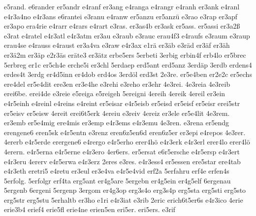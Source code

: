 {    e5rand.
    e6rander
    er5andr
    e4ranf
    er3ang
    e4ranga
    e4rangr
    e4ranh
    er3ank
    e4ranl
    e4r3a4no
    e4r3ans
    e6rantei
    e3ranu
    e4ranw
    er5anzu
    er5anzü
    e3rao
    e3rap
    er3apf
    er3apo
    era4rie
    e4rarr
    e4rars
    e4rart
    e3ras.
    er3as4b
    er3ask
    er5ass.
    er5assi
    er3a2ß
    e3rat
    e4ratel
    e4r3atl
    e4r3atm
    er3au
    e3raub
    e3rauc
    erau4f3
    e4raufs
    e3raum
    e3raup
    erau4se
    e4rauss
    e4raust
    er3a4va
    e3raw
    e4r3ax
    e1rä
    er3äb
    e3räd
    er3äf
    er3äh
    er3ä2m
    er3äp
    e2r3äs
    eräte3
    er3ätz
    erbe5ers
    5erbeti
    3erbig
    erbin4f
    erb4lo
    er5brec
    5erbreg
    er1c
    er5ch4e
    erche5i
    er3chl
    5erdaep
    erd5ant
    erd5anz
    3erdäp
    3erdb
    erdens4
    erdes4t
    3erdg
    er4d5inn
    er4dob
    erd4os
    3erdöl
    erd3st
    2e3re.
    er5e4ben
    er2e2c
    er5echs
    ere4del
    er5e4dit
    ere3en
    er3e4he
    e3rehi
    e3reho
    er3ehr
    4e3rei.
    4e3reia
    4e3reib
    erei6be.
    erei4de
    e3reie
    e5reiga
    e5reigeh
    5ereigni
    4ereih
    4ereik
    4ereil
    er3ein
    e4r5einh
    e4reinl
    e4reins
    e4reint
    er5eisar
    e4r5eisb
    er5eisd
    er5eisf
    er5eisr
    erei5str
    er5eisv
    er5eisw
    4ereit
    erei6t5erk
    4ereiu
    e3reiv
    4ereiz
    er3ele
    er5e4lit
    4e3rem.
    er3emb
    er5e4mig
    ere4mis
    er3emp
    e4r3ems
    e4r3emu
    4e3ren.
    e3rena
    er5endg
    erengene6
    eren5sk
    e4r5entn
    e3renz
    eren6z5en6d
    eren6z5er
    er3epi
    e4repos
    4e3rer.
    4ererb
    e4r5erde
    erergene6
    e4rergo
    e4r5erho
    erer4hö
    e4r3erk
    e4r3erl
    erer4lo
    erer4lö
    4erern.
    e4r5erna
    e4r5erne
    e4r3ero
    4er6ers.
    er5ersat
    e6r5ersche
    e4r5ersp
    e4r3ert
    e4r3eru
    4ererv
    e4r5erwa
    e4r3erz
    2eres
    e3res.
    e4r3ess4
    er5essen
    ere5star
    ere4tab
    e4r3eth
    eretri5
    e4retu
    er3eul
    er3e4va
    e4r5e4vid
    erf2a
    5erfahru
    erf4e
    erfen4s
    5erfolg.
    5erfolgr
    erf4ta
    erg5ant
    er4g5are
    5ergebn
    er4g5ein
    er4g5elf
    6ergenau
    5ergenb
    6ergeni
    5ergenp
    3ergom
    er4g3op
    erg3s4o
    erg3s4p
    erg5sta
    erg5sti
    erg5sto
    erg5str
    erg5stu
    5erhaltb
    er3ho
    e1ri
    e4r3iat
    e3rib
    2eric
    erich6t5er6s
    e4r3ico
    4erie
    erie3b4
    erief4
    erie5fl
    erie4ne
    erien5en
    eri5er.
    eri5ers.
    e3rif
}
